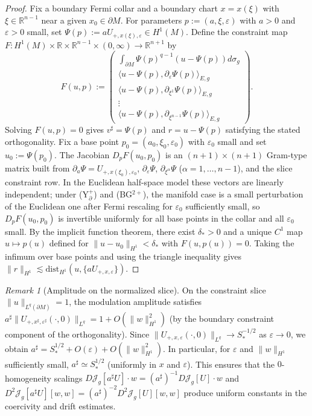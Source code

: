 \documentclass[11pt,reqno,a4paper]{amsart}
\newcommand{\R}{\mathbb{R}}
\numberwithin{equation}{section}
\newcommand{\dist}{\mathrm{dist}}
\theoremstyle{plain}
\theoremstyle{remark}
\newtheorem{remark}[theorem]{Remark}
\theoremstyle{plain}
\begin{document}
\begin{proof}
Fix a boundary Fermi collar and a boundary chart $x=x(\xi)$ with
$\xi\in\R^{n-1}$ near a given $x_0\in\partial M$.
For parameters $p:=(a,\xi,\varepsilon)$ with $a>0$ and
$\varepsilon>0$ small, set $\Psi(p):=aU_{+,x(\xi),\varepsilon}
\in H^1(M)$.
Define the constraint map
$F:H^1(M)\times\R\times\R^{n-1}\times(0,\infty)\to\R^{n+1}$ by
\[
F(u,p):=
\begin{pmatrix}
\displaystyle \int_{\partial M}\Psi(p)^{q-1}(u-\Psi(p))d\sigma_g\\[3mm]
\big\langle u-\Psi(p),\partial_{\varepsilon}\Psi(p)\big\rangle_{E,g}\\[2mm]
\big\langle u-\Psi(p),\partial_{\xi^1}\Psi(p)\big\rangle_{E,g}\\
\vdots\\
\big\langle u-\Psi(p),\partial_{\xi^{n-1}}\Psi(p)\big\rangle_{E,g}
\end{pmatrix}.
\]
Solving $F(u,p)=0$ gives $v^\sharp=\Psi(p)$ and $r=u-\Psi(p)$
satisfying the stated orthogonality.
Fix a base point $p_0=(a_0,\xi_0,\varepsilon_0)$ with $\varepsilon_0$
small and set $u_0:=\Psi(p_0)$.
The Jacobian $D_pF(u_0,p_0)$ is an $(n+1)\times(n+1)$ Gram-type
matrix built from
$\partial_a\Psi=U_{+,x(\xi_0),\varepsilon_0}$,
$\partial_\varepsilon\Psi$,
$\partial_{\xi^\alpha}\Psi$ ($\alpha=1,\dots,n-1$),
and the slice constraint row.
In the Euclidean half-space model these vectors are linearly
independent; under \textup{(Y$^+_{\partial}$)} and \textup{(BG$^{2+}$)},
the manifold case is a small perturbation of the Euclidean one
after Fermi rescaling for $\varepsilon_0$ sufficiently small,
so $D_pF(u_0,p_0)$ is invertible uniformly for all base points
in the collar and all $\varepsilon_0$ small.
By the implicit function theorem, there exist $\delta_\ast>0$
and a unique $C^1$ map $u\mapsto p(u)$ defined for
$\|u-u_0\|_{H^1}<\delta_\ast$ with $F(u,p(u))=0$.
Taking the infimum over base points and using the triangle
inequality gives
$\|r\|_{H^1}\lesssim\dist_{H^1}(u,\{aU_{+,x,\varepsilon}\})$.
\end{proof}

\begin{remark}[Amplitude on the normalized slice]\label{rem:amplitude-bound}
On the constraint slice $\|u\|_{L^q(\partial M)}=1$,
the modulation amplitude satisfies
$a^\sharp\|U_{+,x^\sharp,\varepsilon^\sharp}(\cdot,0)\|_{L^q}=1+O(\|w\|_{H^1}^2)$
(by the boundary constraint component of the orthogonality).
Since $\|U_{+,x,\varepsilon}(\cdot,0)\|_{L^q}\to S_\ast^{-1/2}$ as $\varepsilon\to0$,
we obtain $a^\sharp=S_\ast^{1/2}+O(\varepsilon)+O(\|w\|_{H^1}^2)$.
In particular, for $\varepsilon$ and $\|w\|_{H^1}$ sufficiently small,
$a^\sharp\simeq S_\ast^{1/2}$ (uniformly in $x$ and $\varepsilon$).
This ensures that the $0$-homogeneity scalings
$D\mathcal J_g[a^\sharp U]\cdot w=(a^\sharp)^{-1}D\mathcal J_g[U]\cdot w$
and $D^2\mathcal J_g[a^\sharp U][w,w]=(a^\sharp)^{-2}D^2\mathcal J_g[U][w,w]$
produce uniform constants in the coercivity and drift estimates.
\end{remark}
\end{document}
